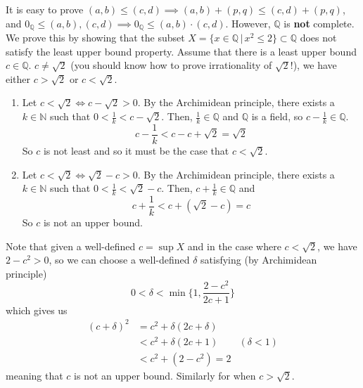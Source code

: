 \begin{solution}
    It is easy to prove $(a, b) \leq (c, d) \implies (a, b) + (p, q) \leq (c, d) + (p, q)$, and $0_{\mathbb{Q}} \leq (a, b), (c, d) \implies 0_\mathbb{Q} \leq (a, b) \cdot (c, d)$. However, $\mathbb{Q}$ is \textbf{not} complete. We prove this by showing that the subset $X = \{x \in \mathbb{Q} \,|\,x^2 \leq 2 \} \subset \mathbb{Q}$ does not satisfy the least upper bound property. Assume that there is a least upper bound $c \in \mathbb{Q}$. $c \neq \sqrt{2}$ (you should know how to prove irrationality of $\sqrt{2}$!), we have either $c > \sqrt{2}$ or $c < \sqrt{2}$. 
    \begin{enumerate}
      \item Let $c < \sqrt{2} \iff c - \sqrt{2} > 0$. By the Archimidean principle, there exists a $k \in \mathbb{N}$ such that $0 < \frac{1}{k} < c - \sqrt{2}$. Then, $\frac{1}{k} \in \mathbb{Q}$ and $\mathbb{Q}$ is a field, so $c - \frac{1}{k} \in \mathbb{Q}$. 
      \begin{equation}
        c - \frac{1}{k} < c - c + \sqrt{2} = \sqrt{2}
      \end{equation}
      So $c$ is not least and so it must be the case that $c < \sqrt{2}$. 
      \item Let $c < \sqrt{2} \iff \sqrt{2} - c > 0$. By the Archimidean principle, there exists a $k \in \mathbb{N}$ such that $0 < \frac{1}{k} < \sqrt{2} - c$. Then, $c + \frac{1}{k} \in \mathbb{Q}$ and 
      \begin{equation}
        c + \frac{1}{k} < c + (\sqrt{2} - c) = c
      \end{equation}
      So $c$ is not an upper bound. 
    \end{enumerate}
    Note that given a well-defined $c = \sup{X}$ and in the case where $c < \sqrt{2}$, we have $2 - c^2 > 0$, so we can choose a well-defined $\delta$ satisfying (by Archimidean principle) 
    \begin{equation}
      0 < \delta < \min \bigg\{1, \frac{2 - c^2}{2c + 1} \bigg\}
    \end{equation}
    which gives us 
    \begin{align*}
      (c + \delta)^2 & = c^2 + \delta(2c + \delta) & \\
      & < c^2 + \delta (2 c + 1) & (\delta < 1) \\
      & < c^2 + (2 - c^2) = 2 & 
    \end{align*}
    meaning that $c$ is not an upper bound. Similarly for when $c > \sqrt{2}$. 
  \end{solution}

